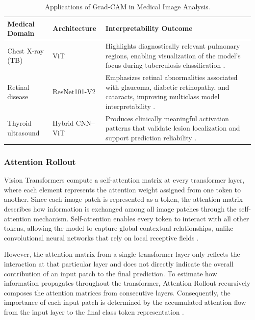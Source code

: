 \documentclass[conference]{IEEEtran}
\begin{document}
\begin{table}[htbp]
    \caption{Applications of Grad-CAM in Medical Image Analysis.}
    \label{tab:medical_gradcam_comparison}
    \centering
    \small
    \setlength{\tabcolsep}{4pt}
    \begin{tabularx}{\columnwidth}{>{\raggedright\arraybackslash}p{2.6cm} >{\raggedright\arraybackslash}p{2cm} >{\raggedright\arraybackslash}X}
        \toprule
        \textbf{Medical Domain} & \textbf{Architecture} & \textbf{Interpretability Outcome} \\
        \midrule
        Chest X-ray (TB) &
        ViT &
        Highlights diagnostically relevant pulmonary regions, enabling visualization of the model's focus during tuberculosis classification \cite{Vanitha2025}.\\
        \addlinespace

        Retinal disease &
        ResNet101-V2 &
        Emphasizes retinal abnormalities associated with glaucoma, diabetic retinopathy, and cataracts, improving multiclass model interpretability \cite{AbdEl-Ghany2025}.\\
        \addlinespace

        Thyroid ultrasound &
        Hybrid CNN--ViT &
        Produces clinically meaningful activation patterns that validate lesion localization and support prediction reliability \cite{Alhafdhi2026}.\\
        \bottomrule
    \end{tabularx}
\end{table}

\subsubsection{Attention Rollout}

Vision Transformers compute a self-attention matrix at every transformer layer, where each element represents the attention weight assigned from one token to another. Since each image patch is represented as a token, the attention matrix describes how information is exchanged among all image patches through the self-attention mechanism. Self-attention enables every token to interact with all other tokens, allowing the model to capture global contextual relationships, unlike convolutional neural networks that rely on local receptive fields \cite{dosovitskiy2021imageworth16x16words}.

However, the attention matrix from a single transformer layer only reflects the interaction at that particular layer and does not directly indicate the overall contribution of an input patch to the final prediction. To estimate how information propagates throughout the transformer, Attention Rollout recursively composes the attention matrices from consecutive layers. Consequently, the importance of each input patch is determined by the accumulated attention flow from the input layer to the final class token representation \cite{Abnar2020}.
\end{document}
